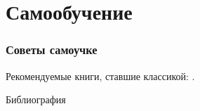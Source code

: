 \section{Самообучение}

\begin{frame}
    \frametitle{Советы самоучке}
    
    Рекомендуемые книги, ставшие классикой: \cite{bib:lisikov:automateBase,bib:saveliev:automateTheory}.
\end{frame}

\begin{frame}[allowframebreaks]{Библиография}
    
    
\end{frame}

